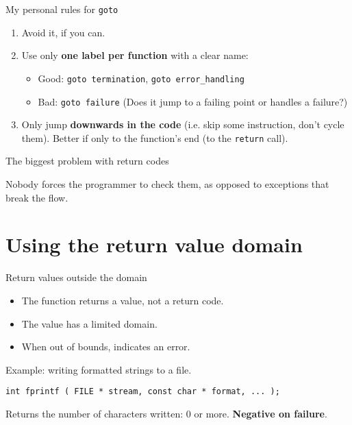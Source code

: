 \documentclass[aspectratio=169,14pt]{beamer}
\begin{document}
\begin{frame}{My personal rules for \texttt{goto}}
\begin{enumerate}
    \item Avoid it, if you can.
    \item Use only \textbf{one label per function} with a clear name:
        \begin{itemize}
            \item Good: \texttt{goto termination}, \texttt{goto error\_handling}
            \item Bad: \texttt{goto failure}  (Does it jump to a failing point or handles a failure?)
        \end{itemize}
    \item Only jump \textbf{downwards in the code} (i.e. skip some instruction, don’t cycle them). Better if only to the function's end (to the \texttt{return} call).
\end{enumerate}
\end{frame}

\begin{frame}{The biggest problem with return codes}
\begin{center}
Nobody forces the programmer to check them, as opposed to exceptions that break the flow.
\end{center}
\end{frame}

\section{Using the return value domain}
\begin{frame}[fragile]{Return values outside the domain}

\begin{itemize}
    \item The function returns a value, not a return code.
    \item The value has a limited domain.
    \item When out of bounds, indicates an error.
\end{itemize}

Example: writing formatted strings to a file.

\begin{lstlisting}[style=cstyle]
int fprintf ( FILE * stream, const char * format, ... );
\end{lstlisting}

Returns the number of characters written: 0 or more. \textbf{Negative on failure}. 
\end{frame}
\end{document}
